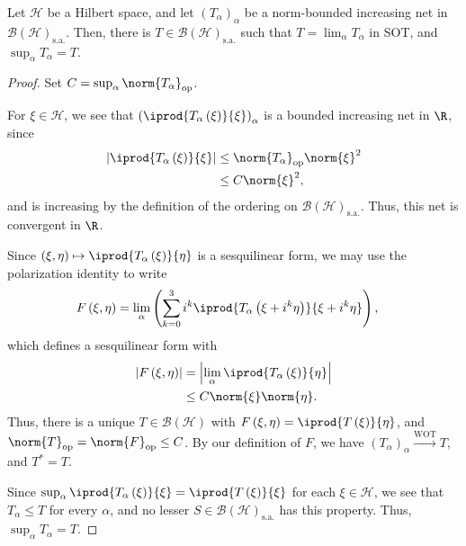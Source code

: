 \documentclass[10pt]{mypackage}
\newcommand{\sa}{\text{s.a.}}
\begin{document}
\begin{proposition}
  Let $\mathcal{H}$ be a Hilbert space, and let $\left(T_{\alpha}\right)_{\alpha}$ be a norm-bounded increasing net in $\mathcal{B}\left(\mathcal{H}\right)_{\sa}$. Then, there is $T\in \mathcal{B}\left(\mathcal{H}\right)_{\sa}$ such that $T = \lim_{\alpha}T_{\alpha}$ in SOT, and $\sup_{\alpha}T_{\alpha} = T$.
\end{proposition}
\begin{proof}
  Set $C = \sup_{\alpha}\norm{T_{\alpha}}_{\text{op}}$.\newline

  For $\xi\in \mathcal{H}$, we see that $ \left( \iprod{T_{\alpha}\left(\xi\right)}{\xi}\right)_{\alpha}$ is a bounded increasing net in $\R$, since
  \begin{align*}
    \left\vert \iprod{T_{\alpha}\left(\xi\right)}{\xi} \right\vert &\leq \norm{T_{\alpha}}_{\text{op}}\norm{\xi}^2\\
                                                                   &\leq C\norm{\xi}^2,
  \end{align*}
  and is increasing by the definition of the ordering on $\mathcal{B}\left(\mathcal{H}\right)_{\sa}$. Thus, this net is convergent in $\R$. \newline

  Since $\left(\xi,\eta\right)\mapsto \iprod{T_{\alpha}\left(\xi\right)}{\eta}$ is a sesquilinear form, we may use the polarization identity to write
  \begin{align*}
    F\left(\xi,\eta\right) &= \lim_{\alpha} \left( \sum_{k=0}^{3}i^{k} \iprod{T_{\alpha}\left(\xi + i^k\eta\right)}{\xi + i^{k}\eta}\right),
  \end{align*}
  which defines a sesquilinear form with
  \begin{align*}
    \left\vert F\left(\xi,\eta\right) \right\vert &= \left\vert \lim_{\alpha} \iprod{T_{\alpha}\left(\xi\right)}{\eta} \right\vert\\
                                                  &\leq C\norm{\xi}\norm{\eta}.
  \end{align*}
  Thus, there is a unique $T\in \mathcal{B}\left(\mathcal{H}\right)$ with $F\left(\xi,\eta\right) = \iprod{T\left(\xi\right)}{\eta}$, and $\norm{T}_{\text{op}} = \norm{F}_{\text{op}} \leq C$. By our definition of $F$, we have $\left(T_{\alpha}\right)_{\alpha}\xrightarrow{\text{WOT}} T$, and $T^{\ast} = T$.\newline

  Since $\sup_{\alpha} \iprod{T_{\alpha}\left(\xi\right)}{\xi} = \iprod{T\left(\xi\right)}{\xi}$ for each $\xi\in \mathcal{H}$, we see that $T_{\alpha}\leq T$ for every $\alpha$, and no lesser $S\in \mathcal{B}\left(\mathcal{H}\right)_{\sa}$ has this property. Thus, $\sup_{\alpha}T_{\alpha} = T$.\newline


\end{proof}
\end{document}
